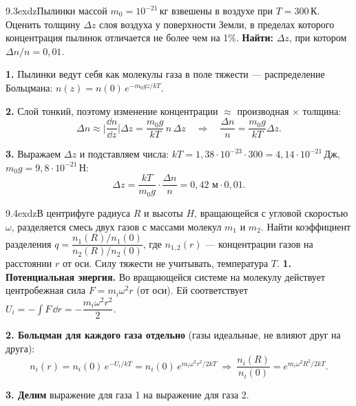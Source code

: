 \begin{problem}{9.3}{exdz}{Пылинки массой $m_0=10^{-21}$\,кг взвешены в воздухе при $T=300$\,К. Оценить толщину $\Delta z$ слоя воздуха у
поверхности Земли, в пределах которого концентрация пылинок отличается не более чем на 1\%.}
\textbf{Найти:} $\Delta z$, при котором $\Delta n/n=0{,}01$.

\textbf{1.} Пылинки ведут себя как молекулы газа в поле тяжести — распределение Больцмана:
$n(z)=n(0)\,e^{-m_0gz/kT}$.

\textbf{2.} Слой тонкий, поэтому изменение концентрации $\approx$ производная $\times$ толщина:
\[\Delta n\approx\Big|\frac{\dd n}{\dd z}\Big|\Delta z=\frac{m_0g}{kT}\,n\,\Delta z\quad\Rightarrow\quad
\frac{\Delta n}{n}=\frac{m_0g}{kT}\Delta z.\]

\textbf{3.} Выражаем $\Delta z$ и подставляем числа: $kT=1{,}38\cdot10^{-23}\cdot300=4{,}14\cdot10^{-21}$\,Дж,
$m_0g=9{,}8\cdot10^{-21}$\,Н:
\[\Delta z=\frac{kT}{m_0g}\cdot\frac{\Delta n}{n}=0{,}42\text{ м}\cdot0{,}01.\]
\end{problem}

\begin{problem}{9.4}{exdz}{В центрифуге радиуса $R$ и высоты $H$, вращающейся с угловой скоростью $\omega$, разделяется смесь двух газов
с массами молекул $m_1$ и $m_2$. Найти коэффициент разделения $q=\dfrac{n_1(R)/n_1(0)}{n_2(R)/n_2(0)}$, где $n_{1,2}(r)$ — концентрации
газов на расстоянии $r$ от оси. Силу тяжести не учитывать, температура $T$.}
\textbf{1. Потенциальная энергия.} Во вращающейся системе на молекулу действует центробежная сила $F=m_i\omega^2r$ (от оси).
Ей соответствует $U_i=-\int F\,\dd r=-\dfrac{m_i\omega^2r^2}{2}$.

\textbf{2. Больцман для каждого газа отдельно} (газы идеальные, не влияют друг на друга):
\[n_i(r)=n_i(0)\,e^{-U_i/kT}=n_i(0)\,e^{m_i\omega^2r^2/2kT}\ \Rightarrow\ \frac{n_i(R)}{n_i(0)}=e^{m_i\omega^2R^2/2kT}.\]

\textbf{3. Делим} выражение для газа 1 на выражение для газа 2.
\end{problem}

